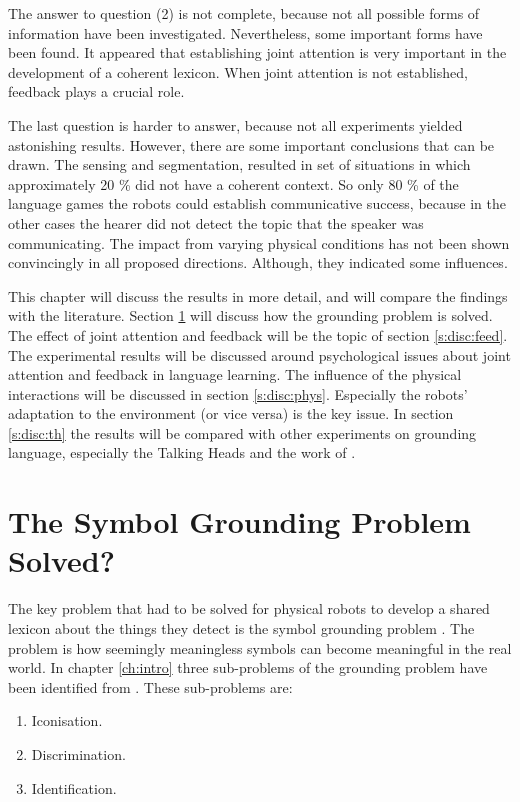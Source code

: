 The answer to question (2) is not complete, because not all possible forms of information have been investigated. Nevertheless, some important forms have been found. It appeared that establishing joint attention is very important in the development of a coherent lexicon. When joint attention is not established, feedback plays a crucial role.

The last question is harder to answer, because not all experiments yielded astonishing results. However, there are some important conclusions that can be drawn. The sensing and segmentation, resulted in set of situations in which approximately 20 \% did not have a coherent context. So only 80 \% of the language games the robots could establish communicative success, because in the other cases the hearer did not detect the topic that the speaker was communicating. The impact from varying physical conditions has not been shown convincingly in all proposed directions. Although, they indicated some influences.


This chapter will discuss the results in more detail, and will compare the findings with the literature. Section \ref{s:disc:global} will discuss how the grounding problem is solved. The effect of joint attention and feedback will be the topic of section \ref{s:disc:feed}. The experimental results will be discussed around psychological issues about joint attention and feedback in language learning. The influence of the physical interactions will be discussed in section \ref{s:disc:phys}. Especially the robots' adaptation to the environment (or vice versa) is the key issue. In section \ref{s:disc:th} the results will be compared with other experiments on grounding language, especially the Talking Heads \citep{belpaeme:1998} and the work of \citet{billard:1997a}.

\section{The Symbol Grounding Problem Solved?}\label{s:disc:global}

The key problem that had to be solved for physical robots to develop a shared lexicon about the things they detect is the symbol grounding problem \citep{harnad:1990}. The problem is how seemingly meaningless symbols can become meaningful in the real world. In chapter \ref{ch:intro} three sub-problems of the grounding problem have been identified from \citep{harnad:1990}. These sub-problems are:

\begin{enumerate}
\item Iconisation.
\item Discrimination.
\item Identification.
\end{enumerate}

